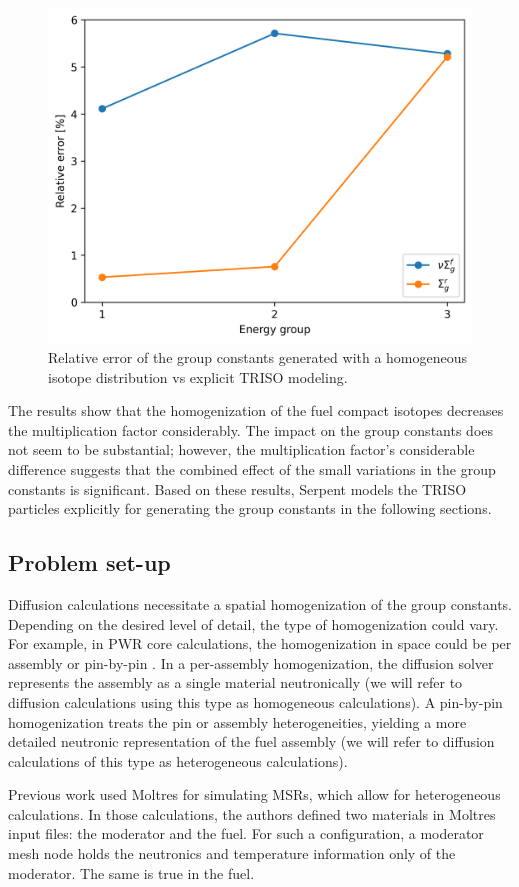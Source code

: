 \begin{figure}[htbp!]
	\centering
	\includegraphics[width=0.43\linewidth]{figures-neutronics/param-comparison}
	\hfill
	\caption{Relative error of the group constants generated with a homogeneous isotope distribution vs explicit TRISO modeling.}
	\label{fig:param-comparison}
\end{figure}

The results show that the homogenization of the fuel compact isotopes decreases the multiplication factor considerably.
The impact on the group constants does not seem to be substantial; however, the multiplication factor's considerable difference suggests that the combined effect of the small variations in the group constants is significant.
Based on these results, Serpent models the TRISO particles explicitly for generating the group constants in the following sections.

\subsection{Problem set-up}
\label{sec:setup}

Diffusion calculations necessitate a spatial homogenization of the group constants.
Depending on the desired level of detail, the type of homogenization could vary.
For example, in PWR core calculations, the homogenization in space could be per assembly or pin-by-pin \cite{krebs_calculational_1990}.
In a per-assembly homogenization, the diffusion solver represents the assembly as a single material neutronically (we will refer to diffusion calculations using this type as homogeneous calculations).
A pin-by-pin homogenization treats the pin or assembly heterogeneities, yielding a more detailed neutronic representation of the fuel assembly (we will refer to diffusion calculations of this type as heterogeneous calculations).

Previous work \cite{lindsay_introduction_2018}\cite{pater_multiphysics_2019} used Moltres for simulating \glspl{MSR}, which allow for heterogeneous calculations.
In those calculations, the authors defined two materials in Moltres input files: the moderator and the fuel.
For such a configuration, a moderator mesh node holds the neutronics and temperature information only of the moderator.
The same is true in the fuel.

